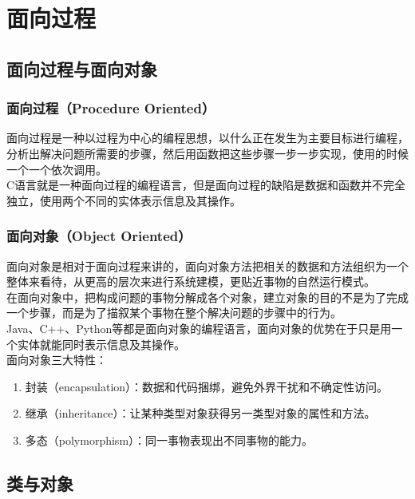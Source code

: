 \chapter{面向过程}

\section{面向过程与面向对象}

\subsection{面向过程（Procedure Oriented）}

面向过程是一种以过程为中心的编程思想，以什么正在发生为主要目标进行编程，分析出解决问题所需要的步骤，然后用函数把这些步骤一步一步实现，使用的时候一个一个依次调用。\\

C语言就是一种面向过程的编程语言，但是面向过程的缺陷是数据和函数并不完全独立，使用两个不同的实体表示信息及其操作。\\

\subsection{面向对象（Object Oriented）}

面向对象是相对于面向过程来讲的，面向对象方法把相关的数据和方法组织为一个整体来看待，从更高的层次来进行系统建模，更贴近事物的自然运行模式。\\

在面向对象中，把构成问题的事物分解成各个对象，建立对象的目的不是为了完成一个步骤，而是为了描叙某个事物在整个解决问题的步骤中的行为。\\

Java、C++、Python等都是面向对象的编程语言，面向对象的优势在于只是用一个实体就能同时表示信息及其操作。\\

面向对象三大特性：

\begin{enumerate}
	\item 封装（encapsulation）：数据和代码捆绑，避免外界干扰和不确定性访问。
	\item 继承（inheritance）：让某种类型对象获得另一类型对象的属性和方法。
	\item 多态（polymorphism）：同一事物表现出不同事物的能力。
\end{enumerate}

\newpage

\section{类与对象}

